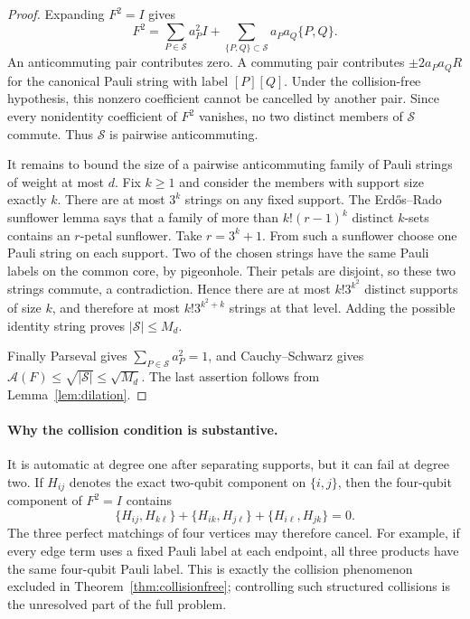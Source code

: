 \documentclass[11pt]{article}
\newcommand{\A}{\mathcal A}
\begin{document}
\begin{proof}
Expanding $F^2=I$ gives
\[
 F^2=\sum_{P\in\mathcal S}a_P^2I
   +\sum_{\{P,Q\}\subset\mathcal S}a_Pa_Q\{P,Q\}.
\]
An anticommuting pair contributes zero.  A commuting pair contributes
$\pm2a_Pa_QR$ for the canonical Pauli string with label $[P][Q]$.  Under the
collision-free hypothesis, this nonzero coefficient cannot be cancelled by
another pair.  Since every nonidentity coefficient of $F^2$ vanishes, no two
distinct members of $\mathcal S$ commute.  Thus $\mathcal S$ is pairwise
anticommuting.

It remains to bound the size of a pairwise anticommuting family of Pauli
strings of weight at most $d$.  Fix $k\ge1$ and consider the members with
support size exactly $k$.  There are at most $3^k$ strings on any fixed
support.  The Erd\H{o}s--Rado sunflower lemma \cite{ER} says that a family of more than
$k!(r-1)^k$ distinct $k$-sets contains an $r$-petal sunflower.  Take
$r=3^k+1$.  From such a sunflower choose one Pauli string on each support.
Two of the chosen strings have the same Pauli labels on the common core, by
pigeonhole.  Their petals are disjoint, so these two strings commute, a
contradiction.  Hence there are at most $k!3^{k^2}$ distinct supports of size
$k$, and therefore at most $k!3^{k^2+k}$ strings at that level.  Adding the
possible identity string proves $|\mathcal S|\le M_d$.

Finally Parseval gives $\sum_{P\in\mathcal S}a_P^2=1$, and Cauchy--Schwarz
gives $\A(F)\le\sqrt{|\mathcal S|}\le\sqrt{M_d}$.  The last assertion follows
from Lemma~\ref{lem:dilation}.
\end{proof}

\paragraph{Why the collision condition is substantive.}
It is automatic at degree one after separating supports, but it can fail at
degree two.  If $H_{ij}$ denotes the exact two-qubit component on
$\{i,j\}$, then the four-qubit component of $F^2=I$ contains
\[
 \{H_{ij},H_{k\ell}\}+\{H_{ik},H_{j\ell}\}
 +\{H_{i\ell},H_{jk}\}=0.
\]
The three perfect matchings of four vertices may therefore cancel.  For
example, if every edge term uses a fixed Pauli label at each endpoint, all
three products have the same four-qubit Pauli label.  This is exactly the
collision phenomenon excluded in Theorem~\ref{thm:collisionfree}; controlling
such structured collisions is the unresolved part of the full problem.
\end{document}
